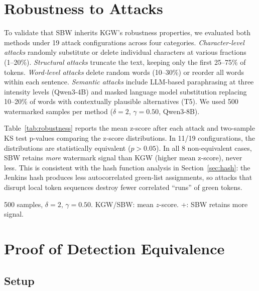 \documentclass[11pt]{article}
\begin{document}
\section{Robustness to Attacks}
\label{app:robustness}

To validate that SBW inherits KGW's robustness properties, we evaluated both methods under 19 attack configurations across four categories. \emph{Character-level attacks} randomly substitute or delete individual characters at various fractions (1--20\%). \emph{Structural attacks} truncate the text, keeping only the first 25--75\% of tokens. \emph{Word-level attacks} delete random words (10--30\%) or reorder all words within each sentence. \emph{Semantic attacks} include LLM-based paraphrasing at three intensity levels (Qwen3-4B) and masked language model substitution replacing 10--20\% of words with contextually plausible alternatives (T5). We used 500 watermarked samples per method ($\delta=2$, $\gamma=0.50$, Qwen3-8B).

Table~\ref{tab:robustness} reports the mean z-score after each attack and two-sample KS test p-values comparing the z-score distributions. In 11/19 configurations, the distributions are statistically equivalent ($p > 0.05$). In all 8 non-equivalent cases, SBW retains \emph{more} watermark signal than KGW (higher mean z-score), never less. This is consistent with the hash function analysis in Section~\ref{sec:hash}: the Jenkins hash produces less autocorrelated green-list assignments, so attacks that disrupt local token sequences destroy fewer correlated ``runs'' of green tokens.

\begin{table}[h]
\caption{Robustness: KGW vs SBW under Attacks}
\label{tab:robustness}
\begin{center}
\footnotesize
\resizebox{\columnwidth}{!}{}
\end{center}
\vspace{-2mm}
{\small 500 samples, $\delta=2$, $\gamma=0.50$. KGW/SBW: mean $z$-score. +: SBW retains more signal.}
\end{table}

\section{Proof of Detection Equivalence}
\label{app:derivation}

\subsection{Setup}
\end{document}
